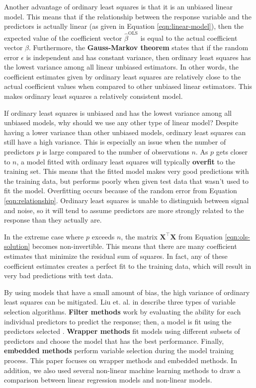 \documentclass{article}
\begin{document}
Another advantage of ordinary least squares is that it is an unbiased linear model. This means that if the relationship between the response variable and the predictors is actually linear (as given in Equation \ref{eqn:linear-model}), then the expected value of the coefficient vector $\hat{\beta}^\text{OLS}$ is equal to the actual coefficient vector $\beta$. Furthermore, the \textbf{Gauss-Markov theorem} states that if the random error $\epsilon$ is independent and has constant variance, then ordinary least squares has the lowest variance among all linear unbiased estimators. In other words, the coefficient estimates given by ordinary least squares are relatively close to the actual coefficient values when compared to other unbiased linear estimators. This makes ordinary least squares a relatively consistent model.

If ordinary least squares is unbiased and has the lowest variance among all unbiased models, why should we use any other type of linear model? Despite having a lower variance than other unbiased models, ordinary least squares can still have a high variance. This is especially an issue when the number of predictors $p$ is large compared to the number of observations $n$. As $p$ gets closer to $n$, a model fitted with ordinary least squares will typically \textbf{overfit} to the training set. This means that the fitted model makes very good predictions with the training data, but performs poorly when given test data that wasn't used to fit the model. Overfitting occurs because of the random error from Equation \ref{eqn:relationship}. Ordinary least squares is unable to distinguish between signal and noise, so it will tend to assume predictors are more strongly related to the response than they actually are.

In the extreme case where $p$ exceeds $n$, the matrix $\mathbf{X}^\top \mathbf{X}$ from Equation \ref{eqn:ols-solution} becomes non-invertible. This means that there are many coefficient estimates that minimize the residual sum of squares. In fact, any of these coefficient estimates creates a perfect fit to the training data, which will result in very bad predictions with test data.

By using models that have a small amount of bias, the high variance of ordinary least squares can be mitigated. Liu et. al. in \cite{liu2020logsum} describe three types of variable selection algorithms. \textbf{Filter methods} work by evaluating the ability for each individual predictors to predict the response; then, a model is fit using the predictors selected \cite{sanchez2007filter, ding2005minimum}. \textbf{Wrapper methods} fit models using different subsets of predictors and choose the model that has the best performance. Finally, \textbf{embedded methods} perform variable selection during the model training process. This paper focuses on wrapper methods and embedded methods. In addition, we also used several non-linear machine learning methods to draw a comparison between linear regression models and non-linear models.
\end{document}
